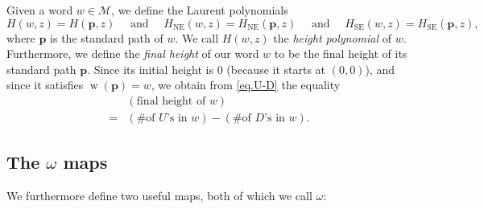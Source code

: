\documentclass[numbers=enddot,12pt,final,onecolumn,notitlepage]{scrartcl}%
\theoremstyle{definition}
\newcommand{\M}{\mathcal{M}}
\newcommand{\pp}{\mathbf{p}}
\newcommand{\SE}{\operatorname{SE}}
\newcommand{\NE}{\operatorname{NE}}
\newcommand{\w}{\operatorname{w}}
\newcommand{\tup}[1]{\left( #1 \right)}
\begin{document}
Given a word $w \in \M$, we define the Laurent polynomials
\[
H(w,z) = H(\pp,z)
\quad \text{ and } \quad
H_{\NE}(w,z) = H_{\NE}(\pp,z)
\quad \text{ and } \quad
H_{\SE}(w,z) = H_{\SE}(\pp,z) ,
\]
where $\pp$ is the standard path of $w$.
We call $H(w,z)$ the \emph{height polynomial} of $w$.
Furthermore, we define the \emph{final height} of our word $w$ to be the final height of its standard path $\pp$.
Since its initial height is $0$ (because it starts at $\tup{0,0}$), and since it satisfies $\w\tup{\pp} = w$, we obtain from \eqref{eq.U-D} the equality
\begin{align}
    & \tup{\text{final height of } w} \nonumber \\
    = &
    \tup{\text{\# of $U$'s in } w}
    - \tup{\text{\# of $D$'s in } w} .
    \label{eq.U-D0}
\end{align}

\subsection{The $\omega$ maps}

We furthermore define two useful maps, both of which we call $\omega$:
\end{document}
